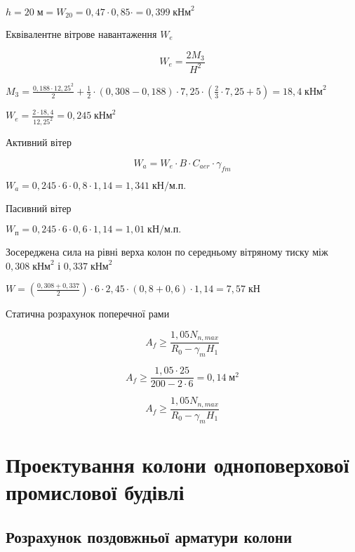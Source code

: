 \documentclass[a4paper,14pt]{article}
\begin{document}
$h=20\;\textit{м} = W_{20}= 0,47\cdot 0,85 \cdot = 0,399\;\textit{кНм}^2$

Еквівалентне вітрове навантаження $W_e$

\begin{equation}
    W_\textit{e}= \frac{2M_3}{H^2}
\end{equation}

$M_3 = \frac{0,188\cdot 12,25^2}{2}+\frac {1}{2}\cdot (0,308-0,188)\cdot 7,25 \cdot (\frac {2}{3}\cdot 7,25 + 5)= 18,4\;\textit{кНм}^2$ 

$W_\textit{e}= \frac{2\cdot 18,4}{12,25^2}= 0,245\;\textit{кНм}^2$ 

Активний вітер 

\begin{equation}
    W_\textit{a}= W_\textit{e} \cdot B\cdot C_{aer}\cdot \gamma_{fm} 
\end{equation}

$W_\textit{a}= 0,245 \cdot 6\cdot 0,8\cdot 1,14 = 1,341\;\textit{кН/м.п.}$   

Пасивний вітер

$W_\textit{п}= 0,245 \cdot 6\cdot 0,6\cdot 1,14 = 1,01\;\textit{кН/м.п.}$ 

Зосереджена сила на рівні верха колон по середньому вітряному тиску між $0,308\;\textit{кНм}^2$ і $0,337\;\textit{кНм}^2$

$W = (\frac{0,308+0,337}{2})\cdot 6 \cdot 2,45 \cdot (0,8+0,6)\cdot 1,14 = 7,57\;\textit{кН}$ 


Статична розрахунок поперечної рами 






\begin{equation}
    A_f\geqslant\frac{1,05N_{n,max}}{R_0-\gamma_mH_1} 
\end{equation}

$$A_f\geqslant\frac{1,05\cdot25}{200-2\cdot6}=0,14\;{\textit{м}^2}$$

\begin{equation}
    A_f\geqslant\frac{1,05N_{n,max}}{R_0-\gamma_mH_1} 
\end{equation}
\newpage
\section{Проектування колони одноповерхової промислової будівлі}
\subsection{Розрахунок поздовжньої арматури колони}
\end{document}

